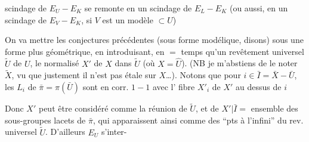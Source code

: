 scindage de $E_U-E_K$ se  remonte en un scindage de $E_L-E_K$ (ou aussi,  en un scindage de $E_V-E_K$, si $V$ est un modèle $\subset U$)

On va mettre les conjectures précédentes (sous forme modélique, disons) sous une forme plus géométrique, en introduisant, en $=$ temps qu'un revêtement universel  $\widetilde U$ de $U$, le normalisé  $X'$ de $X$ dans $\widetilde U$ (où $X=\widehat U$). (NB je m'abstiens de le noter $\widetilde X$, vu que justement il n'est pas étale sur $X$\ldots). Notons que pour $i\in\bar I=\bar X-\bar U$, les  $L_i$ de $\bar\pi=\pi(\bar U)$ sont en corr. $1-1$ avec l' fibre $X'_i$ de $X'$ au dessus de $i$


Donc $X'$ peut être considéré comme la réunion de $\widetilde U$, et de $X'|\bar I=$ ensemble des sous-groupes lacets de $\bar\pi$, qui apparaissent ainsi comme des ``pts à l'infini'' du rev. universel $\widetilde U$. D'ailleurs $E_U$ s'inter-
